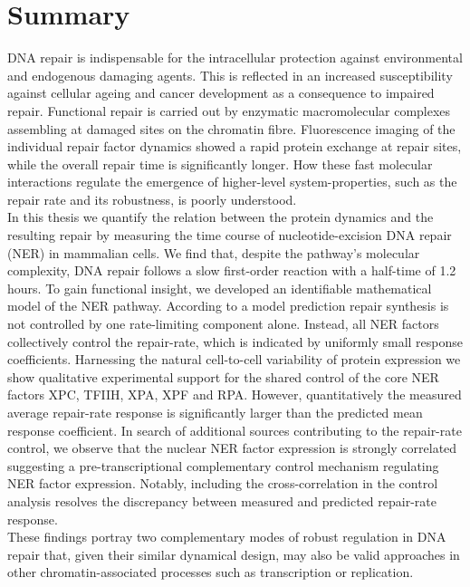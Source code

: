 \chapter*{Summary}





DNA repair is indispensable for the intracellular protection against environmental and endogenous damaging agents.
This is reflected in an increased susceptibility against cellular ageing and cancer development as a consequence to impaired repair. Functional repair is carried out by enzymatic macromolecular complexes assembling at damaged sites on the chromatin fibre. Fluorescence imaging of the individual repair factor dynamics showed a rapid protein exchange at repair sites, while the overall repair time is significantly longer. How these fast molecular interactions regulate the emergence of higher-level system-properties, such as the repair rate and its robustness, is poorly understood.\\ 
In this thesis we quantify the relation between the protein dynamics and the resulting repair by measuring the time course of nucleotide-excision DNA repair (NER) in mammalian cells. We find that, despite the pathway's molecular complexity, DNA repair follows a slow first-order reaction with a half-time of 1.2 hours. To gain functional insight, we developed an identifiable mathematical model of the NER pathway. According to a model prediction repair synthesis is not controlled by one rate-limiting component alone. Instead, all NER factors collectively control the repair-rate, which is indicated by uniformly small response coefficients. Harnessing the natural cell-to-cell variability of protein expression we show qualitative experimental support for the shared control of the core NER factors XPC, TFIIH, XPA, XPF and RPA. However, quantitatively the measured average repair-rate response is significantly larger than the predicted mean response coefficient. In search of additional sources contributing to the repair-rate control, we observe that the nuclear NER factor expression is strongly correlated suggesting a pre-transcriptional complementary control mechanism regulating NER factor expression. Notably, including the cross-correlation in the control analysis resolves the discrepancy between measured and predicted repair-rate response.\\  
These findings portray two complementary modes of robust regulation in DNA repair that, given their similar dynamical design, may also be valid approaches in other chromatin-associated processes such as transcription or replication.  




      
 
%



%